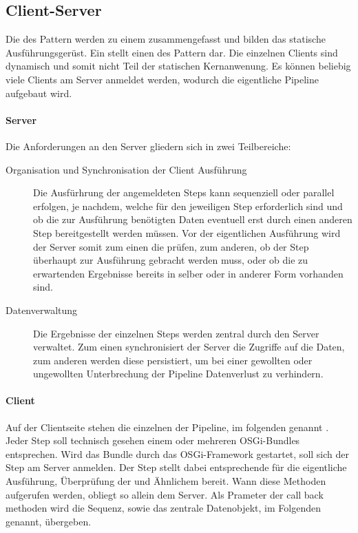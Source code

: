 \subsection{Client-Server}
Die  des  Pattern werden zu einem
 zusammengefasst und bilden das statische Ausführungsgerüst.
Ein  stellt einen  des 
Pattern dar.
Die einzelnen Clients sind dynamisch und somit nicht Teil der
statischen Kernanwenung.
Es können beliebig viele Clients am Server anmeldet werden, wodurch die
eigentliche Pipeline aufgebaut wird.

\paragraph{Server}
Die Anforderungen an den Server gliedern sich in zwei Teilbereiche:
\begin{description}
\item[Organisation und Synchronisation der Client Ausführung]
Die Ausfürhrung der angemeldeten Steps kann sequenziell oder
parallel erfolgen, je nachdem, welche  für den
jeweiligen Step erforderlich sind und ob die zur Ausführung benötigten Daten
eventuell erst durch einen anderen Step bereitgestellt werden müssen.
Vor der eigentlichen Ausführung wird der Server somit zum einen die
 prüfen, zum anderen, ob der Step überhaupt zur Ausführung
gebracht werden muss, oder ob die zu erwartenden Ergebnisse bereits in selber
oder in anderer Form vorhanden sind.
\item[Datenverwaltung] Die Ergebnisse der einzelnen Steps werden zentral durch
den Server verwaltet.
Zum einen synchronisiert der Server die Zugriffe auf die Daten, zum anderen
werden diese persistiert, um bei einer gewollten oder ungewollten Unterbrechung
der Pipeline Datenverlust zu verhindern.
\end{description}

\paragraph{Client}
Auf der Clientseite stehen die einzelnen  der Pipeline, im
folgenden  genannt . Jeder Step soll technisch
gesehen einem oder mehreren OSGi-Bundles entsprechen.
Wird das Bundle durch das OSGi-Framework gestartet, soll sich der Step am Server
anmelden. Der Step stellt dabei entsprechende  für die
eigentliche Ausführung, Überprüfung der  und
Ähnlichem bereit.
Wann diese Methoden aufgerufen werden, obliegt so allein
dem Server.
Als Prameter der call back methoden wird die Sequenz, sowie das zentrale
Datenobjekt, im Folgenden   genannt,
übergeben.

